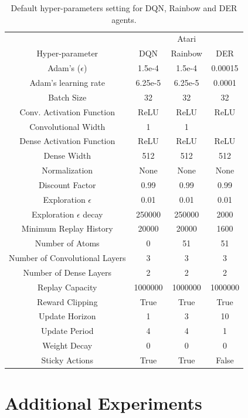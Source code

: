 \begin{table}[!h]
 \centering
  \caption{Default hyper-parameters setting for DQN, Rainbow and DER agents.}
  \label{tbl:defaultvalues}
 \begin{tabular}{@{} cccc @{}}
    \toprule
    & \multicolumn{3}{c}{Atari}\\
    \cmidrule(lr){2-4}
  Hyper-parameter &  DQN & Rainbow & DER\\
    \midrule
     Adam's ($\epsilon$) & 1.5e-4 & 1.5e-4 & 0.00015\\
     Adam's learning rate &  6.25e-5 & 6.25e-5 & 0.0001\\
     Batch Size & 32 & 32 & 32\\
     Conv. Activation Function & ReLU & ReLU & ReLU\\
     Convolutional Width & 1 & 1 &\\
     Dense Activation Function & ReLU & ReLU & ReLU\\
     Dense Width & 512 & 512 & 512\\
     Normalization & None & None & None\\
     Discount Factor & 0.99 & 0.99 & 0.99 \\
     Exploration $\epsilon$ & 0.01 & 0.01 & 0.01\\
     Exploration $\epsilon$ decay & 250000 & 250000 & 2000\\
     Minimum Replay History & 20000 & 20000& 1600\\
     Number of Atoms & 0 & 51 & 51 \\
     Number of Convolutional Layers & 3 & 3 & 3\\
     Number of Dense Layers & 2 & 2& 2\\
     Replay Capacity & 1000000 & 1000000& 1000000 \\
     Reward Clipping & True & True & True\\
     Update Horizon & 1 & 3 & 10\\
     Update Period & 4 & 4 &  1\\
     Weight Decay & 0 & 0 & 0\\
     Sticky Actions & True & True & False\\
     \bottomrule
  \end{tabular}
\end{table}


\section{Additional Experiments}
